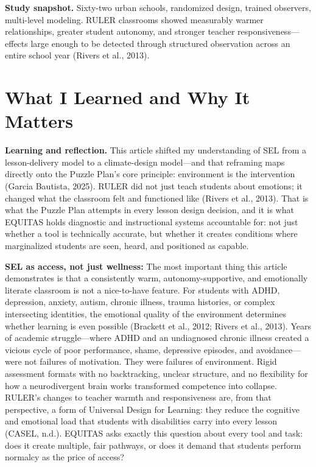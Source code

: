 \documentclass[11pt]{article}
\begin{document}
\begin{TakeawayBox}
\textbf{Study snapshot.} Sixty-two urban schools, randomized design, trained observers, multi-level modeling. RULER classrooms showed measurably warmer relationships, greater student autonomy, and stronger teacher responsiveness---effects large enough to be detected through structured observation across an entire school year (Rivers et al., 2013).
\end{TakeawayBox}

\section{What I Learned and Why It Matters}

\begin{ReflectionBox}
\textbf{Learning and reflection.} This article shifted my understanding of SEL from a lesson-delivery model to a climate-design model---and that reframing maps directly onto the Puzzle Plan's core principle: environment is the intervention (Garcia Bautista, 2025). RULER did not just teach students about emotions; it changed what the classroom felt and functioned like (Rivers et al., 2013). That is what the Puzzle Plan attempts in every lesson design decision, and it is what EQUITAS holds diagnostic and instructional systems accountable for: not just whether a tool is technically accurate, but whether it creates conditions where marginalized students are seen, heard, and positioned as capable.
\end{ReflectionBox}

\textbf{SEL as access, not just wellness:} The most important thing this article demonstrates is that a consistently warm, autonomy-supportive, and emotionally literate classroom is not a nice-to-have feature. For students with ADHD, depression, anxiety, autism, chronic illness, trauma histories, or complex intersecting identities, the emotional quality of the environment determines whether learning is even possible (Brackett et al., 2012; Rivers et al., 2013). Years of academic struggle---where ADHD and an undiagnosed chronic illness created a vicious cycle of poor performance, shame, depressive episodes, and avoidance---were not failures of motivation. They were failures of environment. Rigid assessment formats with no backtracking, unclear structure, and no flexibility for how a neurodivergent brain works transformed competence into collapse. RULER's changes to teacher warmth and responsiveness are, from that perspective, a form of Universal Design for Learning: they reduce the cognitive and emotional load that students with disabilities carry into every lesson (CASEL, n.d.). EQUITAS asks exactly this question about every tool and task: does it create multiple, fair pathways, or does it demand that students perform normalcy as the price of access?
\end{document}
